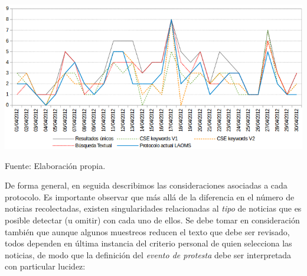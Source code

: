 \documentclass[letterpaper, 11pt]{book}
\theoremstyle{definition}
\theoremstyle{remark}
\begin{document}
\hspace{-1em}\begin{minipage}{\linewidth}
\centering
{} \label{2.8_comparacion_muestreo}
\hspace{-1.8em}\includegraphics[scale=0.6]{img/2.8_comparacion_muestreo.png}
\par\bigskip
\small Fuente: Elaboración propia.
\end{minipage}\bigskip


De forma general, en seguida describimos las consideraciones asociadas a cada protocolo. 
Es importante observar que más allá de la diferencia en el número de noticias recolectadas, existen singularidades relacionadas al \emph{tipo} de noticias que es posible detectar (u omitir) con cada uno de ellos. 
Se debe tomar en consideración también que aunque algunos muestreos reducen el texto que debe ser revisado, todos dependen en última instancia del criterio personal de quien selecciona las noticias, de modo que la definición del \emph{evento de protesta} debe ser interpretada con particular lucidez:
\end{document}
